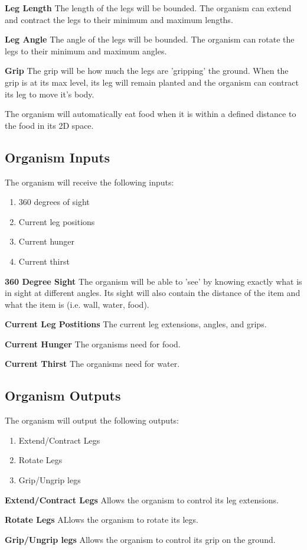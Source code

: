 \documentclass{article} %
\begin{document}
            \textbf{Leg Length}
                The length of the legs will be bounded. The organism can extend and contract the legs to their minimum and maximum lengths.

            \textbf{Leg Angle}
                The angle of the legs will be bounded. The organism can rotate the legs to their minimum and maximum angles.

            \textbf{Grip}
                The grip will be how much the legs are 'gripping' the ground. When the grip is at its max level, its leg will remain planted and the organism can contract its leg to move it's body.

            The organism will automatically eat food when it is within a defined distance to the food in its 2D space.
        
        \subsection{Organism Inputs}
            The organism will receive the following inputs:
            \begin{enumerate}[noitemsep]
                \item 360 degrees of sight
                \item Current leg positions
                \item Current hunger
                \item Current thirst
            \end{enumerate}

            \textbf{360 Degree Sight}
                The organism will be able to 'see' by knowing exactly what is in sight at different angles. Its sight will also contain the distance of the item and what the item is (i.e. wall, water, food).

            \textbf{Current Leg Postitions}
                The current leg extensions, angles, and grips.

            \textbf{Current Hunger}
                The organisms need for food.

            \textbf{Current Thirst}
                The organisms need for water.

        \subsection{Organism Outputs}
            The organism will output the following outputs:
            \begin{enumerate}[noitemsep]
                \item Extend/Contract Legs
                \item Rotate Legs
                \item Grip/Ungrip legs
            \end{enumerate}

            \textbf{Extend/Contract Legs}
                Allows the organism to control its leg extensions.

            \textbf{Rotate Legs}
                ALlows the organism to rotate its legs.
                
            \textbf{Grip/Ungrip legs}
                Allows the organism to control its grip on the ground.
\end{document}
